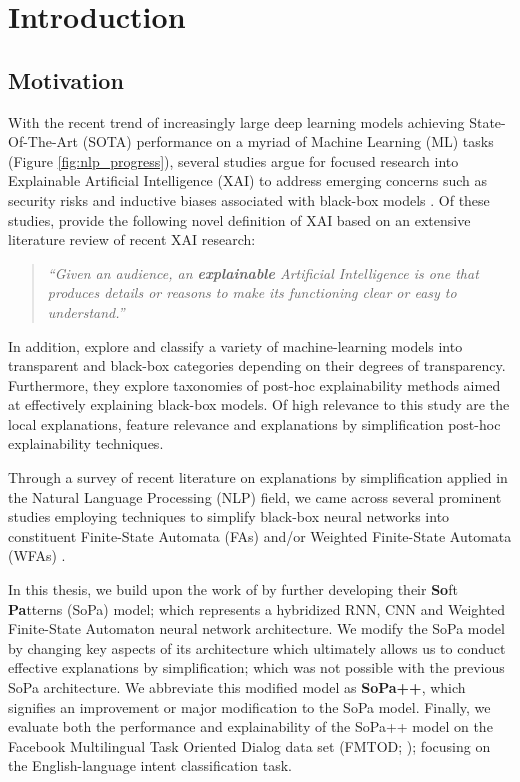 \chapter{Introduction}

\label{chapter:introduction}

\section{Motivation}

With the recent trend of increasingly large deep learning models achieving State-Of-The-Art (SOTA) performance on a myriad of Machine Learning (ML) tasks (Figure \ref{fig:nlp_progress}), several studies argue for focused research into Explainable Artificial Intelligence (XAI) to address emerging concerns such as security risks and inductive biases associated with black-box models \citep{doran2017does,townsend2019extracting,danilevsky2020survey,arrieta2020explainable}. Of these studies, \citet[Page 4, Section 2.2]{arrieta2020explainable} provide the following novel definition of XAI based on an extensive literature review of recent XAI research:

\begin{quote}
  \textit{``Given an audience, an \textbf{explainable} Artificial Intelligence is one that produces details or reasons to make its functioning clear or easy to understand.''}
\end{quote}

In addition, \citet{arrieta2020explainable} explore and classify a variety of machine-learning models into transparent and black-box categories depending on their degrees of transparency. Furthermore, they explore taxonomies of post-hoc explainability methods aimed at effectively explaining black-box models. Of high relevance to this study are the local explanations, feature relevance and explanations by simplification post-hoc explainability techniques. 

Through a survey of recent literature on explanations by simplification applied in the Natural Language Processing (NLP) field, we came across several prominent studies employing techniques to simplify black-box neural networks into constituent Finite-State Automata (FAs) and/or Weighted Finite-State Automata (WFAs) \citep{schwartz2018sopa,peng2018rational,suresh-etal-2019-distilling,wang2019state,jiang2020cold}.

In this thesis, we build upon the work of \citet{schwartz2018sopa} by further developing their \textbf{So}ft \textbf{Pa}tterns (SoPa) model; which represents a hybridized RNN, CNN and Weighted Finite-State Automaton neural network architecture. We modify the SoPa model by changing key aspects of its architecture which ultimately allows us to conduct effective explanations by simplification; which was not possible with the previous SoPa architecture. We abbreviate this modified model as \textbf{SoPa++}, which signifies an improvement or major modification to the SoPa model. Finally, we evaluate both the performance and explainability of the SoPa++ model on the Facebook Multilingual Task Oriented Dialog data set (FMTOD; \citealt{schuster-etal-2019-cross-lingual}); focusing on the English-language intent classification task.

